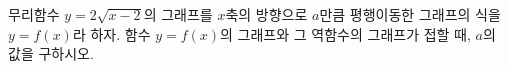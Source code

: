 무리함수 $y=2\sqrt{x-2}$의 그래프를 $x$축의 방향으로 $a$만큼 평행이동한 그래프의 식을 $y=f(x)$라 하자. 함수 $y=f(x)$의 그래프와 그 역함수의 그래프가 접할 때, $a$의 값을 \mbox{구하시오.}
